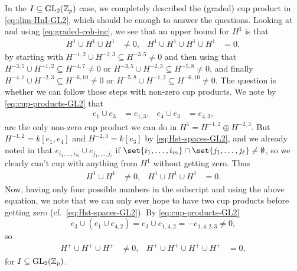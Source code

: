 In the $I \subseteq \operatorname{GL}_{2}(\mathbb{Z}_{p})$ case, we completely described the (graded) cup product in \eqref{eq:dim-HnI-GL2}, which should be enough to answer the questions. Looking at  and using \eqref{eq:graded-coh-inc}, we see that an upper bound for $H^{1}$ is that
\begin{align*}
  H^{1} \cup H^{1} \cup H^{1} &\neq 0, & H^{1} \cup H^{1} \cup H^{1} \cup H^{1} &= 0,
\end{align*}
by starting with $H^{-1,2} \cup H^{-2,3} \subseteq H^{-3,5} \neq 0$ and then using that $H^{-3,5} \cup H^{-1,2} \subseteq H^{-4,7} \neq 0$ or $H^{-3,5} \cup H^{-2,3} \subseteq H^{-5,8} \neq 0$, and finally  $H^{-4,7} \cup H^{-2,3} \subseteq H^{-6,10} \neq 0$ or $H^{-5,8} \cup H^{-1,2} \subseteq H^{-6,10}\neq0$. The question is whether we can follow those steps with non-zero cup products. We note by \eqref{eq:cup-products-GL2} that
\begin{align*}
  e_{1} \cup e_{3} &= e_{1,3}, & e_{4} \cup e_{3} &= e_{4,3},
\end{align*}
are the only non-zero cup product we can do in $H^{1} = H^{-1,2} \oplus H^{-2,3}$. But $H^{-1,2} = k[e_{1},e_{4}]$ and $H^{-2,3} = k[e_{3}]$ by \eqref{eq:Hst-spaces-GL2}, and we already noted in  that $e_{i_{1},\dotsc,i_{m}} \cup e_{j_{1},\dotsc,j_{\ell}}$ if $\set{i_{1},\dotsc,i_{m}} \cap \set{j_{1},\dotsc,j_{\ell}} \neq \emptyset$, so we clearly can't cup with anything from $H^{1}$ without getting zero. Thus
\begin{align*}
  H^{1} \cup H^{1} &\neq 0, & H^{1} \cup H^{1} \cup H^{1} &= 0.
\end{align*}
Now, having only four possible numbers in the subscript and using the above equation, we note that we can only ever hope to have two cup products before getting zero (cf.\ \eqref{eq:Hst-spaces-GL2}). By \eqref{eq:cup-products-GL2}
\begin{equation*}
  e_{3} \cup (e_{1} \cup e_{4,2}) = e_{3} \cup e_{1,4,2} = -e_{1,4,2,3} \neq 0,
\end{equation*}
so
\begin{align*}
  H^{+} \cup H^{+} \cup H^{+} &\neq 0, & H^{+} \cup H^{+} \cup H^{+} \cup H^{+} &= 0,
\end{align*}
for $I \subseteq \operatorname{GL}_{2}(\mathbb{Z}_{p})$.

